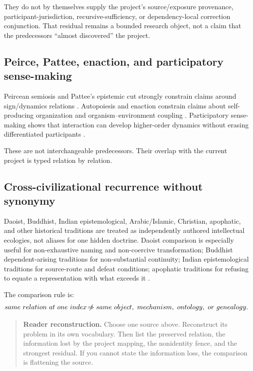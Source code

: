 \documentclass[11pt]{article}
\newcommand{\nrightarrowbyitself}{\mathrel{\not\!\Rightarrow}}
\newenvironment{readercheck}{\begin{quote}\small\noindent\textbf{Reader reconstruction.}\;}{\end{quote}}
\begin{document}
They do not by themselves supply the project's source/exposure provenance, participant-jurisdiction, recursive-sufficiency, or dependency-local correction conjunction. That residual remains a bounded research object, not a claim that the predecessors ``almost discovered'' the project.

\subsection{Peirce, Pattee, enaction, and participatory sense-making}

Peircean semiosis and Pattee's epistemic cut strongly constrain claims around sign/dynamics relations \cite{PeirceSemioticsSEP,Pattee2001EpistemicCut}. Autopoiesis and enaction constrain claims about self-producing organization and organism--environment coupling \cite{MaturanaVarela1980Autopoiesis}. Participatory sense-making shows that interaction can develop higher-order dynamics without erasing differentiated participants \cite{DeJaegherDiPaolo2007Participatory}.

These are not interchangeable predecessors. Their overlap with the current project is typed relation by relation.

\subsection{Cross-civilizational recurrence without synonymy}

Daoist, Buddhist, Indian epistemological, Arabic/Islamic, Christian, apophatic, and other historical traditions are treated as independently authored intellectual ecologies, not aliases for one hidden doctrine. Daoist comparison is especially useful for non-exhaustive naming and non-coercive transformation; Buddhist dependent-arising traditions for non-substantial continuity; Indian epistemological traditions for source-route and defeat conditions; apophatic traditions for refusing to equate a representation with what exceeds it \cite{SEPWongComparative2024,SEPBuddha2024,SEPIndianEpistemology2024,SEPArabicIslamicNatural2022,SEPMysticism2025}.

The comparison rule is:
\begin{equation}
same\ relation\ at\ one\ index
\nrightarrowbyitself
same\ object,\ mechanism,\ ontology,\ or\ genealogy.
\end{equation}

\begin{readercheck}
Choose one source above. Reconstruct its problem in its own vocabulary. Then list the preserved relation, the information lost by the project mapping, the nonidentity fence, and the strongest residual. If you cannot state the information loss, the comparison is flattening the source.
\end{readercheck}
\end{document}
